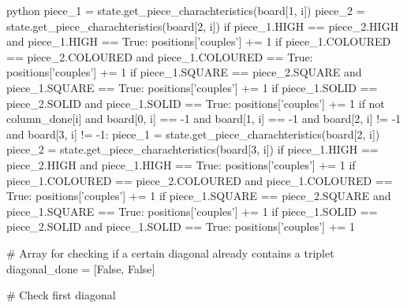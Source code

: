 \begin{mintedbox}{python}
            piece_1 = state.get_piece_charachteristics(board[1, i])
            piece_2 = state.get_piece_charachteristics(board[2, i])
            if piece_1.HIGH == piece_2.HIGH and piece_1.HIGH == True:
                positions['couples'] += 1
            if piece_1.COLOURED == piece_2.COLOURED and piece_1.COLOURED == True:
                positions['couples'] += 1
            if piece_1.SQUARE == piece_2.SQUARE and piece_1.SQUARE == True:
                positions['couples'] += 1
            if piece_1.SOLID == piece_2.SOLID and piece_1.SOLID == True:
                positions['couples'] += 1
        if not column_done[i] and board[0, i] == -1 and board[1, i] == -1 and board[2, i] != -1 and board[3, i] != -1:
            piece_1 = state.get_piece_charachteristics(board[2, i])
            piece_2 = state.get_piece_charachteristics(board[3, i])
            if piece_1.HIGH == piece_2.HIGH and piece_1.HIGH == True:
                positions['couples'] += 1
            if piece_1.COLOURED == piece_2.COLOURED and piece_1.COLOURED == True:
                positions['couples'] += 1
            if piece_1.SQUARE == piece_2.SQUARE and piece_1.SQUARE == True:
                positions['couples'] += 1
            if piece_1.SOLID == piece_2.SOLID and piece_1.SOLID == True:
                positions['couples'] += 1

    # Array for checking if a certain diagonal already contains a triplet
    diagonal_done = [False, False]

    # Check first diagonal


\end{mintedbox}
